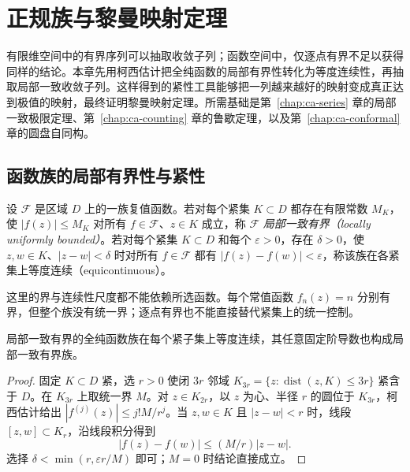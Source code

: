 \setcounter{chapter}{12} %
\chapter{正规族与黎曼映射定理}
\label{chap:ca-normal}

有限维空间中的有界序列可以抽取收敛子列；函数空间中，仅逐点有界不足以获得同样的结论。本章先用柯西估计把全纯函数的局部有界性转化为等度连续性，再抽取局部一致收敛子列。这样得到的紧性工具能够把一列越来越好的映射变成真正达到极值的映射，最终证明黎曼映射定理。所需基础是第~\ref{chap:ca-series} 章的局部一致极限定理、第~\ref{chap:ca-counting} 章的鲁歇定理，以及第~\ref{chap:ca-conformal} 章的圆盘自同构。

\section{函数族的局部有界性与紧性}

\begin{definition}[局部一致有界与等度连续]
设 $\mathcal F$ 是区域 $D$ 上的一族复值函数。若对每个紧集 $K\subset D$ 都存在有限常数 $M_K$，使 $|f(z)|\le M_K$ 对所有 $f\in\mathcal F$、$z\in K$ 成立，称 $\mathcal F$ \emph{局部一致有界（locally uniformly bounded）}。若对每个紧集 $K\subset D$ 和每个 $\varepsilon>0$，存在 $\delta>0$，使 $z,w\in K$、$|z-w|<\delta$ 时对所有 $f\in\mathcal F$ 都有 $|f(z)-f(w)|<\varepsilon$，称该族在各紧集上等度连续（equicontinuous）。
\end{definition}

这里的界与连续性尺度都不能依赖所选函数。每个常值函数 $f_n(z)=n$ 分别有界，但整个族没有统一界；逐点有界也不能直接替代紧集上的统一控制。

\begin{lemma}[柯西估计产生等度连续性]
\label{lem:ca-equicontinuity}
局部一致有界的全纯函数族在每个紧子集上等度连续，其任意固定阶导数也构成局部一致有界族。
\end{lemma}
\begin{proof}
固定 $K\subset D$ 紧，选 $r>0$ 使闭 $3r$ 邻域 $K_{3r}=\{z:\operatorname{dist}(z,K)\le3r\}$ 紧含于 $D$。在 $K_{3r}$ 上取统一界 $M$。对 $z\in K_{2r}$，以 $z$ 为心、半径 $r$ 的圆位于 $K_{3r}$，柯西估计给出 $|f^{(j)}(z)|\le j!M/r^j$。当 $z,w\in K$ 且 $|z-w|<r$ 时，线段 $[z,w]\subset K_r$，沿线段积分得到
\[
 |f(z)-f(w)|\le(M/r)|z-w|.
\]
选择 $\delta<\min(r,\varepsilon r/M)$ 即可；$M=0$ 时结论直接成立。
\end{proof}

